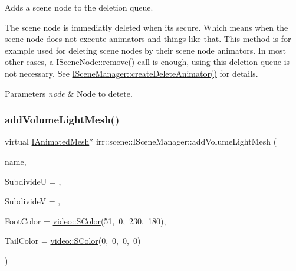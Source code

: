 Adds a scene node to the deletion queue. 

The scene node is immediatly deleted when it\textquotesingle{}s secure. Which means when the scene node does not execute animators and things like that. This method is for example used for deleting scene nodes by their scene node animators. In most other cases, a \hyperlink{classirr_1_1scene_1_1ISceneNode_a2efa2670e29d6bb33b0dd99403b8b69c}{I\+Scene\+Node\+::remove()} call is enough, using this deletion queue is not necessary. See \hyperlink{classirr_1_1scene_1_1ISceneManager_a163cc04ff2cb03852ac891de56200fa3}{I\+Scene\+Manager\+::create\+Delete\+Animator()} for details. 
\begin{DoxyParams}{Parameters}
{\em node} & Node to detete. \\
\hline
\end{DoxyParams}
\mbox{\label{classirr_1_1scene_1_1ISceneManager_a7086c554b86bdf055d6ebcc5950e1f16}} 
\subsubsection{\texorpdfstring{add\+Volume\+Light\+Mesh()}{addVolumeLightMesh()}\hspace{0.1cm}{\footnotesize\ttfamily [1/2]}}
{\footnotesize\ttfamily virtual \hyperlink{classirr_1_1scene_1_1IAnimatedMesh}{I\+Animated\+Mesh}$\ast$ irr\+::scene\+::\+I\+Scene\+Manager\+::add\+Volume\+Light\+Mesh (\begin{DoxyParamCaption}\item[{const \hyperlink{namespaceirr_1_1io_a6468281622ce3a1c46b72e19f32dded5}{io\+::path} \&}]{name,  }\item[{const \hyperlink{namespaceirr_a0416a53257075833e7002efd0a18e804}{u32}}]{SubdivideU = {},  }\item[{const \hyperlink{namespaceirr_a0416a53257075833e7002efd0a18e804}{u32}}]{SubdivideV = {},  }\item[{const \hyperlink{classirr_1_1video_1_1SColor}{video\+::\+S\+Color}}]{Foot\+Color = {\ttfamily \hyperlink{classirr_1_1video_1_1SColor}{video\+::\+S\+Color}(51,~0,~230,~180)},  }\item[{const \hyperlink{classirr_1_1video_1_1SColor}{video\+::\+S\+Color}}]{Tail\+Color = {\ttfamily \hyperlink{classirr_1_1video_1_1SColor}{video\+::\+S\+Color}(0,~0,~0,~0)} }\end{DoxyParamCaption})\hspace{0.3cm}{\ttfamily [pure virtual]}}




